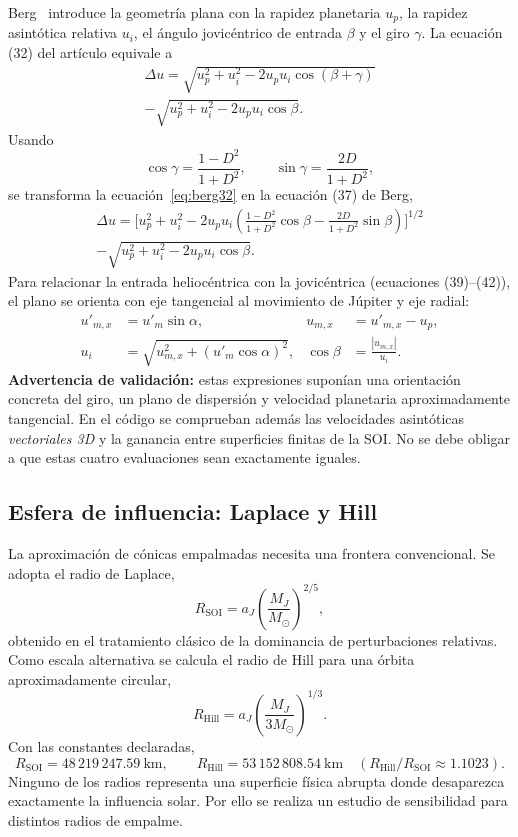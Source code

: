 \documentclass[11pt,a4paper]{article}
\newcommand{\SOI}{R_{\mathrm{SOI}}}
\begin{document}
Berg~\cite{berg2023} introduce la geometría plana con la rapidez planetaria $u_p$, la rapidez asintótica relativa $u_i$, el ángulo jovicéntrico de entrada $\beta$ y el giro $\gamma$. La ecuación (32) del artículo equivale a
\begin{multline}\label{eq:berg32}
\Delta u=\sqrt{u_p^2+u_i^2-2u_pu_i\cos(\beta+\gamma)}\\
-\sqrt{u_p^2+u_i^2-2u_pu_i\cos\beta}.
\end{multline}
Usando
\begin{equation}
\cos\gamma=\frac{1-D^2}{1+D^2},\qquad
\sin\gamma=\frac{2D}{1+D^2},
\end{equation}
se transforma la ecuación~\eqref{eq:berg32} en la ecuación (37) de Berg,
\begin{multline}\label{eq:berg37}
\Delta u=\Biggl[u_p^2+u_i^2-2u_pu_i\left(
\frac{1-D^2}{1+D^2}\cos\beta-\frac{2D}{1+D^2}\sin\beta\right)\Biggr]^{1/2}\\
-\sqrt{u_p^2+u_i^2-2u_pu_i\cos\beta}.
\end{multline}
Para relacionar la entrada heliocéntrica con la jovicéntrica (ecuaciones (39)--(42)), el plano se orienta con eje tangencial al movimiento de Júpiter y eje radial:
\begin{align}
u'_{m,x}&=u'_m\sin\alpha,& u_{m,x}&=u'_{m,x}-u_p,\\
u_i&=\sqrt{u_{m,x}^2+(u'_m\cos\alpha)^2},&
\cos\beta&=\frac{|u_{m,x}|}{u_i}.
\end{align}
\textbf{Advertencia de validación:} estas expresiones suponían una orientación concreta del giro, un plano de dispersión y velocidad planetaria aproximadamente tangencial. En el código se comprueban además las velocidades asintóticas \emph{vectoriales 3D} y la ganancia entre superficies finitas de la SOI. No se debe obligar a que estas cuatro evaluaciones sean exactamente iguales.

\subsection{Esfera de influencia: Laplace y Hill}
La aproximación de cónicas empalmadas necesita una frontera convencional. Se adopta el radio de Laplace,
\begin{equation}\label{eq:soi}
\SOI=a_J\left(\frac{M_J}{M_\odot}\right)^{2/5},
\end{equation}
obtenido en el tratamiento clásico de la dominancia de perturbaciones relativas. Como escala alternativa se calcula el radio de Hill para una órbita aproximadamente circular,
\begin{equation}\label{eq:hill}
R_{\mathrm{Hill}}=a_J\left(\frac{M_J}{3M_\odot}\right)^{1/3}.
\end{equation}
Con las constantes declaradas,
\begin{equation}
\SOI=48\,219\,247.59\ \mathrm{km},\qquad
R_{\mathrm{Hill}}=53\,152\,808.54\ \mathrm{km}
\quad (R_{\mathrm{Hill}}/\SOI\approx1.1023).
\end{equation}
Ninguno de los radios representa una superficie física abrupta donde desaparezca exactamente la influencia solar. Por ello se realiza un estudio de sensibilidad para distintos radios de empalme.
\end{document}
